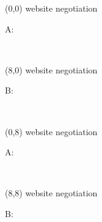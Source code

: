 \documentclass[a4paper]{article}
\newcommand{\myIdentifier}[0]{
website negotiation
}
\newcommand{\myWhitecontent}[0]{

}
\newcommand{\myBlackcontent}[0]{

}
\newcommand{\mycard}[5]{%
	\vspace{0.1cm}
	\small #1 #2
	\par
	\parbox[t][14.6cm][t]{9.5cm}{%
	\hspace{0.1cm} \large#3\\
	\normalsize#4 #5
	}
}
\begin{document}
\selectfont

\begin{textblock}{8}(0,0)
\mycard{}{\myIdentifier}{\parbox{9.0cm}{A:
\myWhitecontent
}}{}{} 
\end{textblock}

\begin{textblock}{8}(8,0)
\mycard{}{\myIdentifier}{\parbox{9.0cm}{B:
\myBlackcontent
}}{}{} 
\end{textblock}

\begin{textblock}{8}(0,8)
\mycard{}{\myIdentifier}{\parbox{9.0cm}{A:
\myWhitecontent
}}{}{} 
\end{textblock}

\begin{textblock}{8}(8,8)
\mycard{}{\myIdentifier}{\parbox{9.0cm}{B:
\myBlackcontent
}}{}{} 
\end{textblock}
\end{document}
